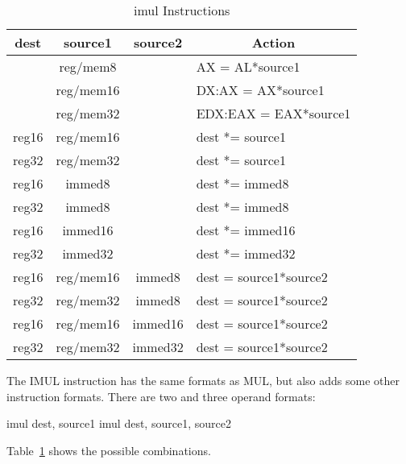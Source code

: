 \begin{table}[t]
\centering
\begin{tabular}{|c|c|c|l|}
\hline
{ \bf dest} & { \bf source1 } & {\bf source2} & \multicolumn{1}{c|}{\bf Action} \\ \hline
            & reg/mem8        &               & AX = AL*source1 \\
            & reg/mem16       &               & DX:AX = AX*source1 \\
            & reg/mem32       &               & EDX:EAX = EAX*source1 \\
reg16       & reg/mem16       &               & dest *= source1 \\
reg32       & reg/mem32       &               & dest *= source1 \\
reg16       & immed8          &               & dest *= immed8 \\
reg32       & immed8          &               & dest *= immed8 \\
reg16       & immed16         &               & dest *= immed16 \\
reg32       & immed32         &               & dest *= immed32 \\
reg16       & reg/mem16       & immed8        & dest = source1*source2 \\
reg32       & reg/mem32       & immed8        & dest = source1*source2 \\
reg16       & reg/mem16       & immed16       & dest = source1*source2 \\
reg32       & reg/mem32       & immed32       & dest = source1*source2 \\
\hline
\end{tabular}
\caption{{\code imul} Instructions \label{tab:imul}}
\end{table}

The {\code IMUL} instruction has the same formats as {\code MUL}, but also
adds some other instruction formats. There are two and three operand formats:
\begin{AsmCodeListing}[numbers=none,frame=none]
      imul   dest, source1
      imul   dest, source1, source2
\end{AsmCodeListing}
Table~\ref{tab:imul} shows the possible combinations.

